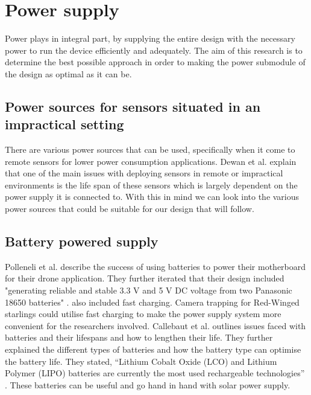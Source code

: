 \documentclass[class=report,11pt,crop=false]{standalone}
\begin{document}
\section{Power supply}

Power plays in integral part, by supplying the entire design with the necessary power to run the device efficiently and adequately. The aim of this research is to determine the best possible approach in order to making the power submodule of the design as optimal as it can be.

\subsection{Power sources for sensors situated in an impractical setting}

There are various power sources that can be used, specifically when it come to remote sensors for lower power consumption applications. Dewan et al. \cite{dewan2014alternative} explain that one of the main issues with deploying sensors in remote or impractical environments is the life span of these sensors which is largely dependent on the power supply it is connected to. With this in mind we can look into the various power sources that could be suitable for our design that will follow.

\subsection{Battery powered supply}

Polleneli et al. \cite{polonelli2020flexible} describe the success of using batteries to power their motherboard for their drone application. They further iterated that their design included "generating reliable and stable 3.3 V and 5 V DC voltage from two Panasonic 18650 batteries" \cite{polonelli2020flexible}. \cite{polonelli2020flexible} also included fast charging. Camera trapping for Red-Winged starlings could utilise fast charging to make the power supply system more convenient for the researchers involved. Callebaut et al. \cite{callebaut2021art} outlines issues faced with batteries and their lifespans and how to lengthen their life. They further explained the different types of batteries and how the battery type can optimise the battery life. They stated, “Lithium Cobalt Oxide (LCO) and Lithium Polymer (LIPO) batteries are currently the most used rechargeable technologies” \cite{callebaut2021art}. These batteries can be useful and go hand in hand with solar power supply.
\end{document}
